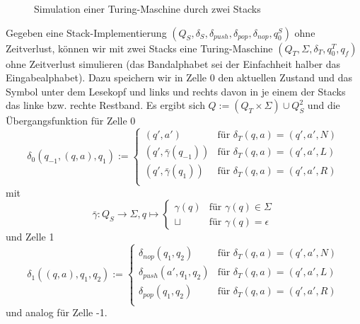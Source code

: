 \documentclass{article}
\begin{document}
\begin{beispiel}
    \begin{figure}[h]
        \centering
        \caption{Simulation einer Turing-Maschine durch zwei Stacks}
    \end{figure}
    Gegeben eine Stack-Implementierung $(Q_S, \delta_S, \delta_{push}, \delta_{pop}, \delta_{nop}, q^S_0)$ ohne Zeitverlust, können wir mit zwei Stacks eine Turing-Maschine $(Q_T, \Sigma, \delta_T, q^T_0, q_f)$ ohne Zeitverlust simulieren (das Bandalphabet sei der Einfachheit halber das Eingabealphabet). Dazu speichern wir in Zelle 0  den aktuellen Zustand und das Symbol unter dem Lesekopf und links und rechts davon in je einem der Stacks das linke bzw. rechte Restband. Es ergibt sich $Q := (Q_T \times \Sigma) \cup Q^2_S$ und die Übergangsfunktion für Zelle 0
    \[ \delta_0(q_{-1}, (q, a), q_1) :=
    \begin{cases}
        (q', a') &\text{für } \delta_T(q, a) = (q', a', N) \\
        (q', \bar\gamma(q_{-1})) &\text{für } \delta_T(q, a) = (q', a', L) \\
        (q', \bar\gamma(q_1)) &\text{für } \delta_T(q, a) = (q', a', R) \\
    \end{cases} \]
mit
\[ \bar\gamma : Q_S \rightarrow \Sigma, q \mapsto \begin{cases}
        \gamma(q) &\text{für } \gamma(q) \in \Sigma \\
        \sqcup &\text{für } \gamma(q) = \epsilon
    \end{cases} \]
und Zelle 1
    \[ \delta_1((q, a), q_1, q_2) :=
    \begin{cases}
        \delta_{nop}(q_1, q_2) &\text{für } \delta_T(q, a) = (q', a', N) \\
        \delta_{push}(a', q_1, q_2) &\text{für } \delta_T(q, a) = (q', a', L) \\
        \delta_{pop}(q_1, q_2) &\text{für } \delta_T(q, a) = (q', a', R) \\
    \end{cases} \]
und analog für Zelle -1.
\end{beispiel}
\end{document}
